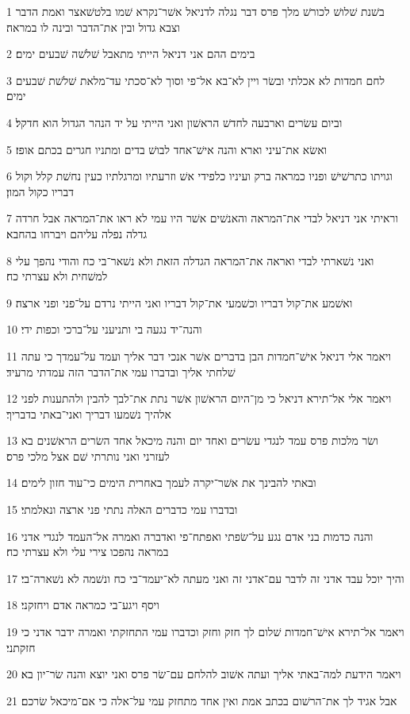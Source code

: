 \par 1 בשׁנת שׁלושׁ לכורשׁ מלך פרס דבר נגלה לדניאל אשׁר־נקרא שׁמו בלטשׁאצר ואמת הדבר וצבא גדול ובין את־הדבר ובינה לו במראה׃
\par 2 בימים ההם אני דניאל הייתי מתאבל שׁלשׁה שׁבעים ימים׃
\par 3 לחם חמדות לא אכלתי ובשׂר ויין לא־בא אל־פי וסוך לא־סכתי עד־מלאת שׁלשׁת שׁבעים ימים׃
\par 4 וביום עשׂרים וארבעה לחדשׁ הראשׁון ואני הייתי על יד הנהר הגדול הוא חדקל׃
\par 5 ואשׂא את־עיני וארא והנה אישׁ־אחד לבושׁ בדים ומתניו חגרים בכתם אופז׃
\par 6 וגויתו כתרשׁישׁ ופניו כמראה ברק ועיניו כלפידי אשׁ וזרעתיו ומרגלתיו כעין נחשׁת קלל וקול דבריו כקול המון׃
\par 7 וראיתי אני דניאל לבדי את־המראה והאנשׁים אשׁר היו עמי לא ראו את־המראה אבל חרדה גדלה נפלה עליהם ויברחו בהחבא׃
\par 8 ואני נשׁארתי לבדי ואראה את־המראה הגדלה הזאת ולא נשׁאר־בי כח והודי נהפך עלי למשׁחית ולא עצרתי כח׃
\par 9 ואשׁמע את־קול דבריו וכשׁמעי את־קול דבריו ואני הייתי נרדם על־פני ופני ארצה׃
\par 10 והנה־יד נגעה בי ותניעני על־ברכי וכפות ידי׃
\par 11 ויאמר אלי דניאל אישׁ־חמדות הבן בדברים אשׁר אנכי דבר אליך ועמד על־עמדך כי עתה שׁלחתי אליך ובדברו עמי את־הדבר הזה עמדתי מרעיד׃
\par 12 ויאמר אלי אל־תירא דניאל כי מן־היום הראשׁון אשׁר נתת את־לבך להבין ולהתענות לפני אלהיך נשׁמעו דבריך ואני־באתי בדבריך׃
\par 13 ושׂר מלכות פרס עמד לנגדי עשׂרים ואחד יום והנה מיכאל אחד השׂרים הראשׁנים בא לעזרני ואני נותרתי שׁם אצל מלכי פרס׃
\par 14 ובאתי להבינך את אשׁר־יקרה לעמך באחרית הימים כי־עוד חזון לימים׃
\par 15 ובדברו עמי כדברים האלה נתתי פני ארצה ונאלמתי׃
\par 16 והנה כדמות בני אדם נגע על־שׂפתי ואפתח־פי ואדברה ואמרה אל־העמד לנגדי אדני במראה נהפכו צירי עלי ולא עצרתי כח׃
\par 17 והיך יוכל עבד אדני זה לדבר עם־אדני זה ואני מעתה לא־יעמד־בי כח ונשׁמה לא נשׁארה־בי׃
\par 18 ויסף ויגע־בי כמראה אדם ויחזקני׃
\par 19 ויאמר אל־תירא אישׁ־חמדות שׁלום לך חזק וחזק וכדברו עמי התחזקתי ואמרה ידבר אדני כי חזקתני׃
\par 20 ויאמר הידעת למה־באתי אליך ועתה אשׁוב להלחם עם־שׂר פרס ואני יוצא והנה שׂר־יון בא׃
\par 21 אבל אגיד לך את־הרשׁום בכתב אמת ואין אחד מתחזק עמי על־אלה כי אם־מיכאל שׂרכם׃

